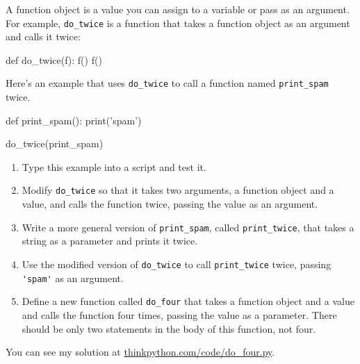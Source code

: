 \begin{exercise}

A function object is a value you can assign to a variable
or pass as an argument.  For example, \verb"do_twice" is a function
that takes a function object as an argument and calls it twice:

\beforeverb
\begin{pyexo}
def do_twice(f):
    f()
    f()
\end{pyexo}
\afterverb

Here's an example that uses \verb"do_twice" to call a function
named \verb"print_spam" twice.

\beforeverb
\begin{pyexo}
def print_spam():
    print('spam')

do_twice(print_spam)
\end{pyexo}
\afterverb

\begin{enumerate}

\item Type this example into a script and test it.

\item Modify \verb"do_twice" so that it takes two arguments, a
function object and a value, and calls the function twice,
passing the value as an argument.

\item Write a more general version of \verb"print_spam", called
\verb"print_twice", that takes a string as a parameter and prints
it twice.

\item Use the modified version of \verb"do_twice" to call
\verb"print_twice" twice, passing \verb"'spam'" as an argument.

\item Define a new function called 
\verb"do_four" that takes a function object and a value
and calls the function four times, passing the value
as a parameter.  There should be only
two statements in the body of this function, not four.

\end{enumerate}

{\color{red} You can see my solution at \url{thinkpython.com/code/do_four.py}.}

\end{exercise}



